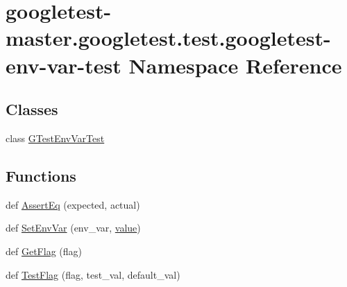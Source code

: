 \hypertarget{namespacegoogletest-master_1_1googletest_1_1test_1_1googletest-env-var-test}{}\section{googletest-\/master.googletest.\+test.\+googletest-\/env-\/var-\/test Namespace Reference}
\label{namespacegoogletest-master_1_1googletest_1_1test_1_1googletest-env-var-test}
\subsection*{Classes}
\begin{DoxyCompactItemize}
\item 
class \mbox{\hyperlink{classgoogletest-master_1_1googletest_1_1test_1_1googletest-env-var-test_1_1_g_test_env_var_test}{G\+Test\+Env\+Var\+Test}}
\end{DoxyCompactItemize}
\subsection*{Functions}
\begin{DoxyCompactItemize}
\item 
def \mbox{\hyperlink{namespacegoogletest-master_1_1googletest_1_1test_1_1googletest-env-var-test_a88fd4580c525aa618208816f96b531e6}{Assert\+Eq}} (expected, actual)
\item 
def \mbox{\hyperlink{namespacegoogletest-master_1_1googletest_1_1test_1_1googletest-env-var-test_ae1c40901908fb259a46549e0e12a6c8e}{Set\+Env\+Var}} (env\+\_\+var, \mbox{\hyperlink{_obj__test_2lib_2googletest-master_2googlemock_2test_2gmock-matchers__test_8cc_a337b8a670efc0b086ad3af163f3121b6}{value}})
\item 
def \mbox{\hyperlink{namespacegoogletest-master_1_1googletest_1_1test_1_1googletest-env-var-test_a2c8c4db62e68cc0fb4e121611cf01141}{Get\+Flag}} (flag)
\item 
def \mbox{\hyperlink{namespacegoogletest-master_1_1googletest_1_1test_1_1googletest-env-var-test_a8ac0bd902facc9bdf523902fc6ddc3d6}{Test\+Flag}} (flag, test\+\_\+val, default\+\_\+val)
\end{DoxyCompactItemize}
